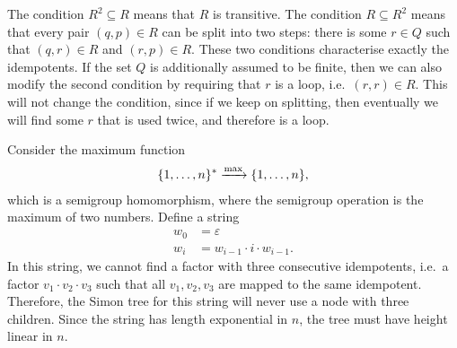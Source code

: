  { 
        The condition $R^2 \subseteq R$ means that $R$ is transitive. The condition $R \subseteq R^2$ means that every pair $(q,p) \in R$ can be split into two steps: there is some $r \in Q$ such that $(q,r) \in R$ and $(r,p) \in R$. These two conditions characterise exactly the idempotents. If the set $Q$ is additionally assumed to be finite, then we can also modify the second condition by requiring that $r$ is a loop, i.e.~$(r,r) \in R$. This will not change the condition, since if we keep on splitting, then eventually we will find some $r$ that is used twice, and therefore is a loop.
     }
     



 {
    Consider the maximum function
\begin{align*}
\{1,\ldots,n\}^* \xrightarrow \max \{1,\ldots,n\},
\end{align*}
which is a semigroup homomorphism, where the semigroup operation is the maximum of two numbers. Define a string 
\begin{align*}
w_0 & = \varepsilon \\
w_i & = w_{i-1} \cdot i \cdot  w_{i-1}.
\end{align*}
In this string, we cannot find a factor with three consecutive idempotents, i.e.~a factor $v_1 \cdot v_2 \cdot v_3$ such that all $v_1,v_2,v_3$ are mapped to the same idempotent. Therefore, the Simon tree for this string will never use a node with three children. Since the string has length exponential in $n$, the tree must have height linear in $n$. 
}

